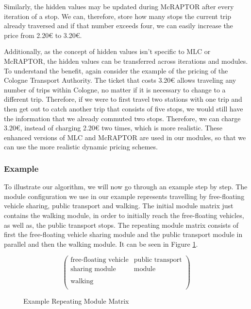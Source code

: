 Similarly, the hidden values may be updated during McRAPTOR after every iteration of a stop.
We can, therefore, store how many stops the current trip already traversed and if that number exceeds four, we can easily increase the price from 2.20€ to 3.20€.

Additionally, as the concept of hidden values isn't specific to MLC or McRAPTOR, the hidden values can be transferred across iterations and modules.
To understand the benefit, again consider the example of the pricing of the Cologne Transport Authority.
The ticket that costs 3.20€ allows traveling any number of trips within Cologne, no matter if it is necessary to change to a different trip.
Therefore, if we were to first travel two stations with one trip and then get out to catch another trip that consists of five stops, we would still have the information that we already commuted two stops.
Therefore, we can charge 3.20€, instead of charging 2.20€ two times, which is more realistic.
These enhanced versions of MLC and McRAPTOR are used in our modules, so that we can use the more realistic dynamic pricing schemes.


\subsubsection{Example}
\label{subsubsec:example}

To illustrate our algorithm, we will now go through an example step by step.
The module configuration we use in our example represents travelling by free-floating vehicle sharing, public transport and walking.
The initial module matrix just contains the walking module, in order to initially reach the free-floating vehicles, as well as, the public transport stops.
The repeating module matrix consists of first the free-floating vehicle sharing module and the public transport module in parallel and then the walking module.
It can be seen in Figure \ref{fig:example_module_matrix}.


\begin{figure}[ht]
\centering
\[
\begin{pmatrix}
\text{free-floating vehicle} & \text{public transport} \\
\text{sharing module} & \text{module} \\
\\
\text{walking} & \\
\end{pmatrix}
\]
\caption{Example Repeating Module Matrix}
\label{fig:example_module_matrix}
\end{figure}


